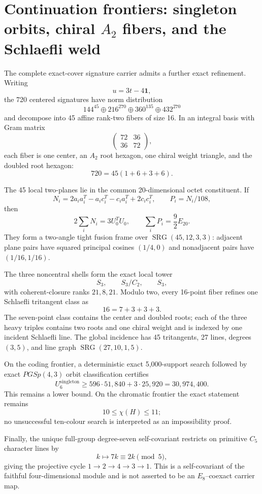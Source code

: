 \section{Continuation frontiers: singleton orbits, chiral $A_2$ fibers, and the Schlaefli weld}
\label{sec:bt2707-continuation}

The complete exact-cover signature carrier admits a further exact refinement.  Writing
\[
 u=3t-4\mathbf 1,
\]
the 720 centered signatures have norm distribution
\[
144^{45}\oplus216^{270}\oplus360^{135}\oplus432^{270}
\]
and decompose into 45 affine rank-two fibers of size 16.  In an integral basis with Gram matrix
\[
\begin{pmatrix}72&36\\36&72\end{pmatrix},
\]
each fiber is one center, an $A_2$ root hexagon, one chiral weight triangle, and the doubled root hexagon:
\[
720=45(1+6+3+6).
\]

The 45 local two-planes lie in the common 20-dimensional octet constituent. If
\[
N_i=2a_ia_i^T-a_ic_i^T-c_ia_i^T+2c_ic_i^T,
\qquad P_i=N_i/108,
\]
then
\[
2\sum_iN_i=3U_0^TU_0,
\qquad
\sum_iP_i=\frac92E_{20}.
\]
They form a two-angle tight fusion frame over $\operatorname{SRG}(45,12,3,3)$: adjacent plane pairs have squared principal cosines $(1/4,0)$ and nonadjacent pairs have $(1/16,1/16)$.

The three noncentral shells form the exact local tower
\[
S_3,\qquad S_3/C_2,\qquad S_3,
\]
with coherent-closure ranks $21,8,21$.  Modulo two, every 16-point fiber refines one Schlaefli tritangent class as
\[
16=7+3+3+3.
\]
The seven-point class contains the center and doubled roots; each of the three heavy triples contains two roots and one chiral weight and is indexed by one incident Schlaefli line.  The global incidence has 45 tritangents, 27 lines, degrees $(3,5)$, and line graph $\operatorname{SRG}(27,10,1,5)$.

On the coding frontier, a deterministic exact 5,000-support search followed by exact $PGSp(4,3)$ orbit classification certifies
\[
U_6^{\mathrm{singleton}}\ge
596\cdot51{,}840+3\cdot25{,}920
=30{,}974{,}400.
\]
This remains a lower bound.  On the chromatic frontier the exact statement remains
\[
10\le\chi(H)\le11;
\]
no unsuccessful ten-colour search is interpreted as an impossibility proof.

Finally, the unique full-group degree-seven self-covariant restricts on primitive $C_5$ character lines by
\[
k\mapsto7k\equiv2k\pmod5,
\]
giving the projective cycle $1\to2\to4\to3\to1$.  This is a self-covariant of the faithful four-dimensional module and is not asserted to be an $E_8$--coexact carrier map.
